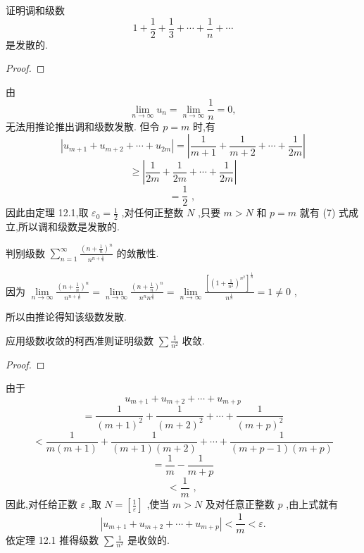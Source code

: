 \begin{example}

\end{example}
证明调和级数
\[
1 + \frac{1}{2} + \frac{1}{3} + \cdots  + \frac{1}{n} + \cdots
\]
是发散的.

\begin{proof}

\end{proof}
由
\[
\mathop{\lim }\limits_{{n \rightarrow  \infty }}{u}_{n} = \mathop{\lim }\limits_{{n \rightarrow  \infty }}\frac{1}{n} = 0,
\]
无法用推论推出调和级数发散. 但令 \(p = m\) 时,有
\[
\left| {{u}_{m + 1} + {u}_{m + 2} + \cdots  + {u}_{2m}}\right|  = \left| {\frac{1}{m + 1} + \frac{1}{m + 2} + \cdots  + \frac{1}{2m}}\right|
\]
\[
\geq  \left| {\frac{1}{2m} + \frac{1}{2m} + \cdots  + \frac{1}{2m}}\right|
\]
\[
= \frac{1}{2}\text{ , }
\]
因此由定理 12.1,取 \({\varepsilon }_{0} = \frac{1}{2}\) ,对任何正整数 \(N\) ,只要 \(m > N\) 和 \(p = m\) 就有 (7) 式成立,所以调和级数是发散的.

\begin{example}

\end{example}
判别级数 \(\mathop{\sum }\limits_{{n = 1}}^{\infty }\frac{{\left( n + \frac{1}{n}\right) }^{n}}{{n}^{n + \frac{1}{n}}}\) 的敛散性.

\begin{solution}

\end{solution}
因为 \(\mathop{\lim }\limits_{{n \rightarrow  \infty }}\frac{{\left( n + \frac{1}{n}\right) }^{n}}{{n}^{n + \frac{1}{n}}} = \mathop{\lim }\limits_{{n \rightarrow  \infty }}\frac{{\left( n + \frac{1}{n}\right) }^{n}}{{n}^{n}{n}^{\frac{1}{n}}} = \mathop{\lim }\limits_{{n \rightarrow  \infty }}\frac{{\left\lbrack  {\left( 1 + \frac{1}{{n}^{2}}\right) }^{{n}^{2}}\right\rbrack  }^{\frac{1}{n}}}{{n}^{\frac{1}{n}}} = 1 \neq  0\) ,

所以由推论得知该级数发散.

\begin{example}

\end{example}
应用级数收敛的柯西准则证明级数 \(\sum \frac{1}{{n}^{2}}\) 收敛.

\begin{proof}

\end{proof}
由于
\[
{u}_{m + 1} + {u}_{m + 2} + \cdots  + {u}_{m + p}
\]
\[
= \frac{1}{{\left( m + 1\right) }^{2}} + \frac{1}{{\left( m + 2\right) }^{2}} + \cdots  + \frac{1}{{\left( m + p\right) }^{2}}
\]
\[
< \frac{1}{m\left( {m + 1}\right) } + \frac{1}{\left( {m + 1}\right) \left( {m + 2}\right) } + \cdots  + \frac{1}{\left( {m + p - 1}\right) \left( {m + p}\right) }
\]
\[
= \frac{1}{m} - \frac{1}{m + p}
\]
\[
< \frac{1}{m}\text{ , }
\]
因此,对任给正数 \(\varepsilon\) ,取 \(N = \left\lbrack  \frac{1}{\varepsilon }\right\rbrack\) ,使当 \(m > N\) 及对任意正整数 \(p\) ,由上式就有
\[
\left| {{u}_{m + 1} + {u}_{m + 2} + \cdots  + {u}_{m + p}}\right|  < \frac{1}{m} < \varepsilon .
\]
依定理 12.1 推得级数 \(\sum \frac{1}{{n}^{2}}\) 是收敛的.

